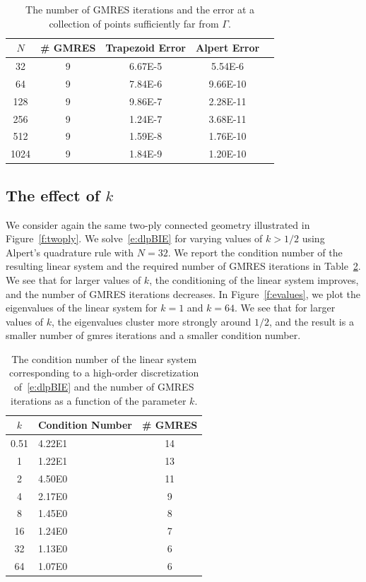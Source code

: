 \documentclass[final]{siamltex}
\begin{document}
\begin{table}[htps]
\centering
\begin{tabular}{c|cccc}
$N$ & \# GMRES & Trapezoid Error & Alpert Error  \\
\hline
32   & 9 & 6.67E-5 & 5.54E-6  \\
64   & 9 & 7.84E-6 & 9.66E-10 \\
128  & 9 & 9.86E-7 & 2.28E-11 \\
256  & 9 & 1.24E-7 & 3.68E-11 \\
512  & 9 & 1.59E-8 & 1.76E-10 \\  
1024 & 9 & 1.84E-9 & 1.20E-10 \\ 
\end{tabular}
\caption{\label{t:example1} The number of GMRES iterations and the
error at a collection of points sufficiently far from $\Gamma$.}
\end{table}

\subsection{The effect of $k$}
We consider again the same two-ply connected geometry illustrated in
Figure~\ref{f:twoply}.  We solve~\eqref{e:dlpBIE} for varying values of
$k > 1/2$ using Alpert's quadrature rule with $N=32$.  We report the
condition number of the resulting linear system and the required number
of GMRES iterations in Table~\ref{t:example2}.  We see that for larger
values of $k$, the conditioning of the linear system improves, and the
number of GMRES iterations decreases.  In Figure~\ref{f:evalues}, we
plot the eigenvalues of the linear system for $k=1$ and $k=64$.  We see
that for larger values of $k$, the eigenvalues cluster more strongly
around $1/2$, and the result is a smaller number of gmres iterations and
a smaller condition number.

\begin{table}[htps]
\centering
\begin{tabular}{c>{\centering}m{2cm}c}
$k$ & Condition Number & \# GMRES \\
\hline
0.51 & 4.22E1 & 14 \\
1    & 1.22E1 & 13 \\
2    & 4.50E0 & 11 \\
4    & 2.17E0 & 9  \\
8    & 1.45E0 & 8  \\  
16   & 1.24E0 & 7  \\ 
32   & 1.13E0 & 6  \\
64   & 1.07E0 & 6  \\
\end{tabular}
\caption{\label{t:example2} The condition number of the linear system
corresponding to a high-order discretization of~\eqref{e:dlpBIE} and the
number of GMRES iterations as a function of the parameter $k$.}
\end{table}
\end{document}
